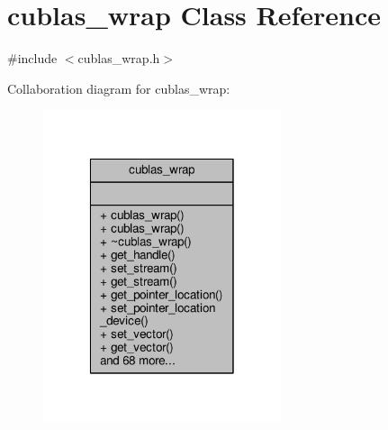 \hypertarget{classcublas__wrap}{\section{cublas\-\_\-wrap Class Reference}
\label{classcublas__wrap}
}


{\ttfamily \#include $<$cublas\-\_\-wrap.\-h$>$}



Collaboration diagram for cublas\-\_\-wrap\-:\nopagebreak
\begin{figure}[H]
\begin{center}
\leavevmode
\includegraphics[width=198pt]{classcublas__wrap__coll__graph}
\end{center}
\end{figure}
